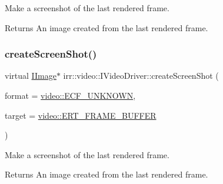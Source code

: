 Make a screenshot of the last rendered frame. 

\begin{DoxyReturn}{Returns}
An image created from the last rendered frame. 
\end{DoxyReturn}
\mbox{\label{classirr_1_1video_1_1IVideoDriver_a50db0e36d406089167facf70b2eb4706}} 
\subsubsection{\texorpdfstring{create\+Screen\+Shot()}{createScreenShot()}\hspace{0.1cm}{\footnotesize\ttfamily [2/2]}}
{\footnotesize\ttfamily virtual \hyperlink{classirr_1_1video_1_1IImage}{I\+Image}$\ast$ irr\+::video\+::\+I\+Video\+Driver\+::create\+Screen\+Shot (\begin{DoxyParamCaption}\item[{\hyperlink{namespaceirr_1_1video_a1d5e487888c32b1674a8f75116d829ed}{video\+::\+E\+C\+O\+L\+O\+R\+\_\+\+F\+O\+R\+M\+AT}}]{format = {\ttfamily \hyperlink{namespaceirr_1_1video_a1d5e487888c32b1674a8f75116d829eda8d25e5e1e9c83f95c4f7d48e11688a51}{video\+::\+E\+C\+F\+\_\+\+U\+N\+K\+N\+O\+WN}},  }\item[{\hyperlink{namespaceirr_1_1video_a5b61a3f2bd5d458f76f2eb20b0f40972}{video\+::\+E\+\_\+\+R\+E\+N\+D\+E\+R\+\_\+\+T\+A\+R\+G\+ET}}]{target = {\ttfamily \hyperlink{namespaceirr_1_1video_a5b61a3f2bd5d458f76f2eb20b0f40972a232d0f49241a378e11d4a37e752d3d73}{video\+::\+E\+R\+T\+\_\+\+F\+R\+A\+M\+E\+\_\+\+B\+U\+F\+F\+ER}} }\end{DoxyParamCaption})\hspace{0.3cm}{\ttfamily [pure virtual]}}



Make a screenshot of the last rendered frame. 

\begin{DoxyReturn}{Returns}
An image created from the last rendered frame. 
\end{DoxyReturn}
\mbox{\label{classirr_1_1video_1_1IVideoDriver_aea64c03fc205f23ec7575884fb7309c8}} 
